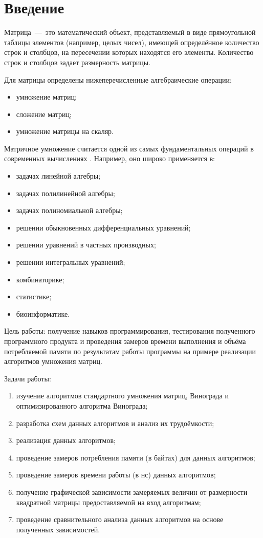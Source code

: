 \setcounter{page}{3}
\chapter*{Введение}
Матрица~---~это математический объект, представляемый в виде прямоугольной таблицы элементов (например, целых чисел), имеющей определённое количество строк и столбцов, на пересечении которых находятся его элементы. Количество строк и столбцов задает размерность матрицы.

Для матрицы определены нижеперечисленные алгебраические операции:
\begin{itemize}
	\item умножение матриц;
	\item сложение матриц;
	\item умножение матрицы на скаляр.
\end{itemize}

Матричное умножение считается одной из самых фундаментальных операций в современных вычислениях \cite{web_item1}. Например, оно широко применяется в:
\begin{itemize}
	\item задачах линейной алгебры;
	\item задачах полилинейной алгебры;
	\item задачах полиномиальной алгебры;
	\item решении обыкновенных дифференциальных уравнений;
	\item решении уравнений в частных производных;
	\item решении интегральных уравнений;
	\item комбинаторике;
	\item статистике;
	\item биоинформатике.
\end{itemize}

Цель работы: получение навыков программирования, тестирования полученного программного продукта и проведения замеров времени выполнения и объёма потребляемой памяти по результатам работы программы на примере реализации алгоритмов умножения матриц.

\newpage

Задачи работы:
\begin{enumerate}[label={\arabic*)}]
	\item изучение алгоритмов стандартного умножения матриц, Винограда и оптимизированного алгоритма Винограда;
	\item разработка схем данных алгоритмов и анализ их трудоёмкости;
	\item реализация данных алгоритмов;
	\item проведение замеров потребления памяти (в байтах) для данных алгоритмов; 
	\item проведение замеров времени работы (в нс) данных алгоритмов; 
	\item получение графической зависимости замеряемых величин от размерности квадратной матрицы предоставляемой на вход алгоритмам;
	\item проведение сравнительного анализа данных алгоритмов на основе полученных зависимостей.
\end{enumerate}

\newpage